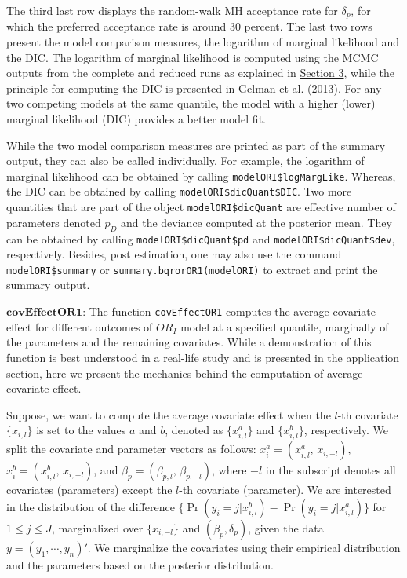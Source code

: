 The third last row displays the random-walk MH acceptance rate for \(\delta_{p}\), for which the preferred acceptance rate is around 30 percent. The last two rows present the model comparison measures, the logarithm of marginal likelihood and the DIC. The logarithm of marginal likelihood is computed using the MCMC outputs from the complete and reduced runs as explained in \protect\hyperlink{sec:ML}{Section 3}, while the principle for computing the DIC is presented in Gelman et al. (2013). For any two competing models at the same quantile, the model with a higher (lower) marginal likelihood (DIC) provides a better model fit.

While the two model comparison measures are printed as part of the summary output, they can also be called individually. For example, the logarithm of marginal likelihood can be obtained by calling \texttt{modelORI\$logMargLike}. Whereas, the DIC can be obtained by calling \texttt{modelORI\$dicQuant\$DIC}. Two more quantities that are part of the object \texttt{modelORI\$dicQuant} are effective number of parameters denoted \(p_{D}\) and the deviance computed at the posterior mean. They can be obtained by calling \texttt{modelORI\$dicQuant\$pd} and \texttt{modelORI\$dicQuant\$dev}, respectively. Besides, post estimation, one may also use the command \texttt{modelORI\$summary} or \texttt{summary.bqrorOR1(modelORI)} to extract and print the summary output.

\(\textbf{covEffectOR1}\): The function \texttt{covEffectOR1} computes the average covariate effect for different outcomes of \(OR_{I}\) model at a specified quantile, marginally of the parameters and the remaining covariates. While a demonstration of this function is best understood in a real-life study and is presented in the application section, here we present the mechanics behind the computation of average covariate effect.

Suppose, we want to compute the average covariate effect when the \(l\)-th covariate \(\{x_{i,l}\}\) is set to the values \(a\) and \(b\), denoted as \(\{x_{i,l}^{a}\}\) and \(\{ x_{i,l}^{b}\}\), respectively. We split the covariate and parameter vectors as follows: \(x_{i}^{a} = ( x_{i,l}^{a}, \, x_{i,-l})\), \(x_{i}^{b} = (x_{i,l}^{b}, \, x_{i,-l})\), and \(\beta_{p} = (\beta_{p,l}, \, \beta_{p,-l})\), where \(-l\) in the subscript denotes all covariates (parameters) except the \(l\)-th covariate (parameter). We are interested in the distribution of the difference \(\{\Pr(y_{i}=j|x_{i,l}^{b}) - \Pr(y_{i}=j|x_{i,l}^{a} ) \}\) for \(1 \le j \le J\), marginalized over \(\{x_{i,-l}\}\) and \((\beta_{p},\delta_{p})\), given the data \(y=(y_{1}, \cdots, y_{n})'\). We marginalize the covariates using their empirical distribution and the parameters based on the posterior distribution.


